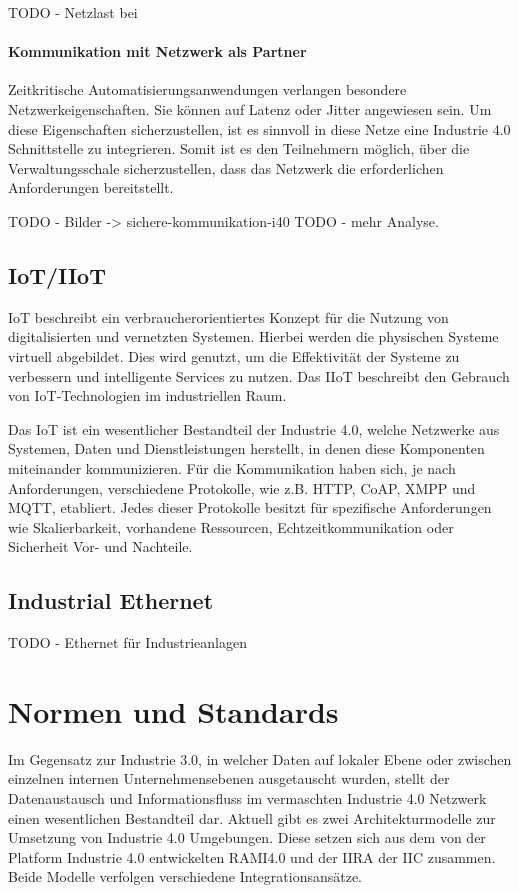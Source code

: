 TODO - Netzlast bei 

\paragraph{Kommunikation mit Netzwerk als Partner}
Zeitkritische Automatisierungsanwendungen verlangen besondere Netzwerkeigenschaften. Sie können auf Latenz oder Jitter angewiesen sein. Um diese Eigenschaften sicherzustellen, ist es sinnvoll in diese Netze eine Industrie 4.0 Schnittstelle zu integrieren. Somit ist es den Teilnehmern möglich, über die Verwaltungsschale sicherzustellen, dass das Netzwerk die erforderlichen Anforderungen bereitstellt. \cite{sichKom2017}

TODO - Bilder -> sichere-kommunikation-i40
TODO - mehr Analyse.

\subsection{\ac{IoT}/\ac{IIoT}}
\ac{IoT} beschreibt ein verbraucherorientiertes Konzept für die Nutzung von digitalisierten und vernetzten Systemen. Hierbei werden die physischen Systeme virtuell abgebildet. Dies wird genutzt, um die Effektivität der Systeme zu verbessern und intelligente Services zu nutzen. Das \ac{IIoT} beschreibt den Gebrauch von \ac{IoT}-Technologien im industriellen Raum.

Das \ac{IoT} ist ein wesentlicher Bestandteil der Industrie 4.0, welche Netzwerke aus Systemen, Daten und Dienstleistungen herstellt, in denen diese Komponenten miteinander kommunizieren. Für die Kommunikation haben sich, je nach Anforderungen, verschiedene Protokolle, wie z.B. \ac{HTTP}, \ac{CoAP}, \ac{XMPP} und \ac{MQTT}, etabliert. Jedes dieser Protokolle besitzt für spezifische Anforderungen wie Skalierbarkeit, vorhandene Ressourcen, Echtzeitkommunikation oder Sicherheit Vor- und Nachteile. 

\subsection{Industrial Ethernet}
TODO - Ethernet für Industrieanlagen

\section{Normen und Standards}
\label{Grundlagen:Normen und Standards}
Im Gegensatz zur Industrie 3.0, in welcher Daten auf lokaler Ebene oder zwischen einzelnen internen Unternehmensebenen ausgetauscht wurden, stellt der Datenaustausch und Informationsfluss im vermaschten Industrie 4.0 Netzwerk einen wesentlichen Bestandteil dar. Aktuell gibt es zwei Architekturmodelle zur Umsetzung von Industrie 4.0 Umgebungen. Diese setzen sich aus dem von der Platform Industrie 4.0 entwickelten \ac{RAMI4.0} und der \ac{IIRA} der \ac{IIC} zusammen. Beide Modelle verfolgen verschiedene Integrationsansätze.

